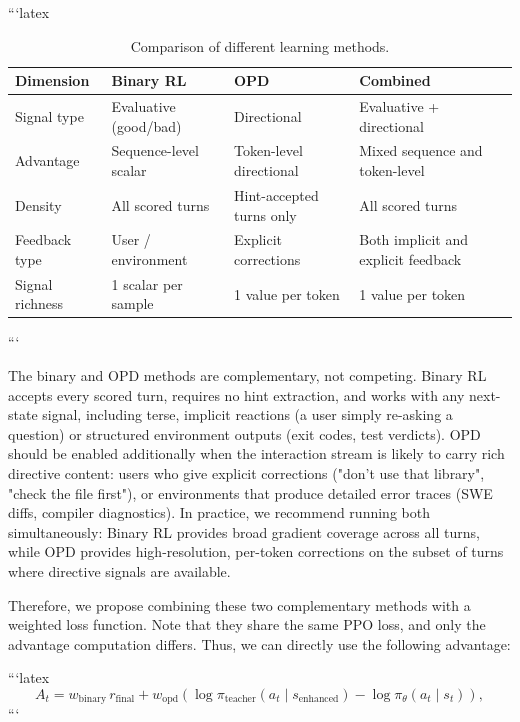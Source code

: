 ```latex
\begin{table}[h]
\centering
\small
\caption{Comparison of different learning methods.}
\label{tab:method_comparison}
\begin{tabular}{@{}llll@{}}
\toprule
\textbf{Dimension} & \textbf{Binary RL} & \textbf{OPD} & \textbf{Combined} \\
\midrule
Signal type & Evaluative (good/bad) & Directional  & Evaluative + directional \\
Advantage & Sequence-level scalar & Token-level directional & Mixed sequence and token-level \\
Density & All scored turns & Hint-accepted turns only & All scored turns \\
Feedback type & User / environment  & Explicit corrections  & Both implicit and explicit feedback \\
Signal richness & 1 scalar per sample & 1 value per token & 1 value per token \\
\bottomrule
\end{tabular}
\end{table}
```


The binary and OPD methods are complementary, not competing. Binary RL accepts every scored turn, requires no hint extraction, and works with any next-state signal, including terse, implicit reactions (a user simply re-asking a question) or structured environment outputs (exit codes, test verdicts). OPD should be enabled additionally when the interaction stream is likely to carry rich directive content: users who give explicit corrections ("don't use that library", "check the file first"), or environments that produce detailed error traces (SWE diffs, compiler diagnostics). In practice, we recommend running both simultaneously: Binary RL provides broad gradient coverage across all turns, while OPD provides high-resolution, per-token corrections on the subset of turns where directive signals are available.

Therefore, we propose combining these two complementary methods with a weighted loss function. Note that they share the same PPO loss, and only the advantage computation differs. Thus, we can directly use the following advantage:


```latex
\begin{equation*}
    A_t = w_{\text{binary}} \, r_{\text{final}} + w_{\text{opd}} \left( \log \pi_{\text{teacher}}(a_t \mid s_{\text{enhanced}}) - \log \pi_\theta(a_t \mid s_t) \right),
\end{equation*}
```


